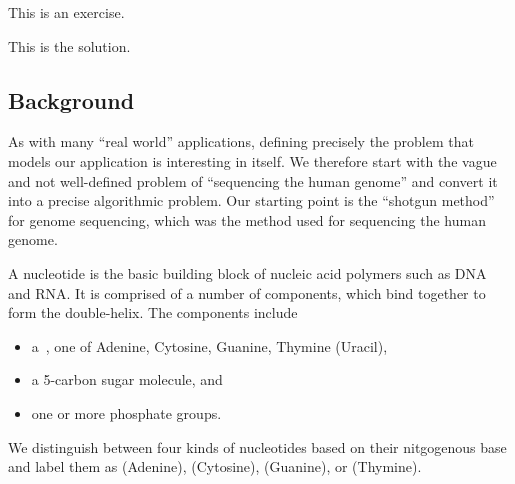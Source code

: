 \begin{cflex}
\begin{exercise}
This is an exercise.
\end{exercise}

\begin{solution}
This is the solution.
\end{solution}
\end{cflex}



\subsection{Background}


\begin{gram}
As with many ``real world'' applications, defining precisely the
problem that models our application is interesting in itself.  
%
We
therefore start with the vague and not well-defined problem of
``sequencing the human genome'' and convert it into a precise
algorithmic problem.  
%
Our starting point is the ``shotgun method'' for
genome sequencing, which was the method used for sequencing the human
genome.
\end{gram}


\begin{definition}[Nucleotide]
A nucleotide is the basic building block of nucleic acid polymers such
as DNA and RNA. 
%
It is comprised of a number of components, which bind together to form
the double-helix.
%
The components include 
\begin{itemize}
\item a~, one of Adenine,
Cytosine, Guanine, Thymine (Uracil), 

\item a 5-carbon sugar molecule, and
\item one or more phosphate groups.
\end{itemize}
%
We distinguish between four kinds of nucleotides based on their
nitgogenous base and label them as  (Adenine), 
(Cytosine),  (Guanine), or  (Thymine).
\end{definition}

